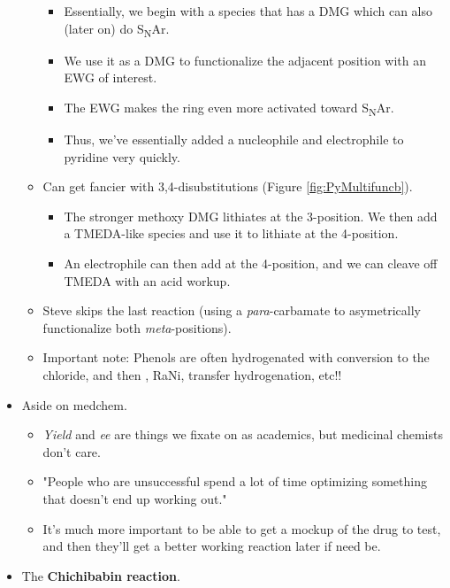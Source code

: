 \documentclass[../notes.tex]{subfiles}
\begin{document}
\begin{itemize}
\begin{itemize}
        \begin{itemize}
            \item Essentially, we begin with a species that has a DMG which can also (later on) do S\textsubscript{N}Ar.
            \item We use it as a DMG to functionalize the adjacent position with an EWG of interest.
            \item The EWG makes the ring even more activated toward S\textsubscript{N}Ar.
            \item Thus, we've essentially added a nucleophile and electrophile to pyridine very quickly.
        \end{itemize}
        \item Can get fancier with 3,4-disubstitutions (Figure \ref{fig:PyMultifuncb}).
        \begin{itemize}
            \item The stronger methoxy DMG lithiates at the 3-position. We then add a TMEDA-like species and use it to lithiate at the 4-position.
            \item An electrophile can then add at the 4-position, and we can cleave off TMEDA with an acid workup.
        \end{itemize}
        \item Steve skips the last reaction (using a \emph{para}-carbamate to asymetrically functionalize both \emph{meta}-positions).
        \item Important note: Phenols are often hydrogenated with  conversion to the chloride, and then , RaNi, transfer hydrogenation, etc!!
    \end{itemize}
    \item Aside on medchem.
    \begin{itemize}
        \item \emph{Yield} and \emph{ee} are things we fixate on as academics, but medicinal chemists don't care.
        \item "People who are unsuccessful spend a lot of time optimizing something that doesn't end up working out."
        \item It's much more important to be able to get a mockup of the drug to test, and then they'll get a better working reaction later if need be.
    \end{itemize}
    \item The \textbf{Chichibabin reaction}.
    \begin{figure}[h!]
        \centering
        \footnotesize

\end{figure}
\end{itemize}
\end{document}
